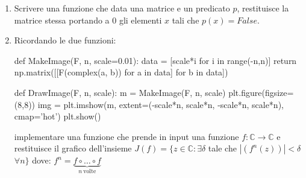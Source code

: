 \documentclass[11pt,a4]{article}
\begin{document}
\begin{enumerate}
\item Scrivere una funzione che data una matrice e un predicato $p$, 
restituisce la matrice stessa portando a 0 gli elementi $x$ tali che $p(x)=False$.\\

\item Ricordando le due funzioni:
\begin{python}
def MakeImage(F, n, scale=0.01):
    data = [scale*i for i in range(-n,n)]
    return np.matrix([[F(complex(a, b)) for a in data] for b in data])
\end{python}
\begin{python}
def DrawImage(F, n, scale):
    m = MakeImage(F, n, scale)
    plt.figure(figsize=(8,8))
    img = plt.imshow(m, extent=(-scale*n, scale*n, -scale*n, scale*n), cmap='hot')
    plt.show()
\end{python}
implementare una funzione che prende in input una funzione $f:\mathbb{C}\rightarrow \mathbb{C}$ e restituisce il grafico dell'insieme $J(f)=\{ z\in \mathbb{C}: \exists \delta$ tale che $|(f^n(z))|<\delta$ $\forall n \}$ dove:
$f^n=\underbrace{f\circ\ldots\circ f}_{n\ \mathrm{volte}}$
\end{enumerate}
\end{document}
